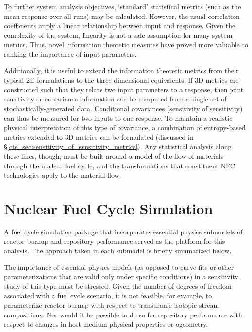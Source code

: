 To further system analysis objectives, `standard' statistical metrics (such as the mean response
over all runs) may be calculated.  However, the usual correlation coefficients imply a linear
relationship between input and response.  Given the complexity of the system, linearity is not
a safe assumption for many system metrics.  Thus, novel information theoretic measures have
proved more valuable to ranking the importance of input parameters.

Additionally, it is useful to extend the information theoretic metrics from their typical 2D
formulations to the three dimensional equivalents.  If 3D metrics are constructed such that
they relate two input parameters to a response, then joint sensitivity or co-variance information
can be computed from a single set of stochastically-generated data.  Conditional covariances
(sensitivity of sensitivity) can thus be measured for two inputs to one response.
To maintain a realistic physical interpretation of this type of covariance, a combination of
entropy-based metrics extended to 3D metrics can be formulated  (discussed in
\S \ref{cts_sec:sensitivity_of_sensitivity_metrics}).  Any statistical analysis along these lines, though,
must be built around a model of the flow of materials through the nuclear fuel cycle, and the
transformations that constituent NFC technologies apply to the material flow.




\section{Nuclear Fuel Cycle Simulation}
\label{cts_sec:nfcsim}

A fuel cycle simulation package that incorporates essential physics submodels of reactor burnup 
\cite{Scopatz2009} and repository performance \cite{Li2009} served as the platform for this analysis. 
The approach taken in each submodel is briefly summarized below. 

The importance of essential physics models (as opposed to curve fits or other parameterizations that are valid
only under specific conditions) in a sensitivity study of this type must be stressed. Given the number of
degrees of freedom associated with a fuel cycle scenario, it is not feasible, for example, to parameterize
reactor burnup with respect to transuranic isotopic stream compositions. Nor would it be possible to do
so for repository performance with respect to changes in host medium physical properties or ogeometry.

